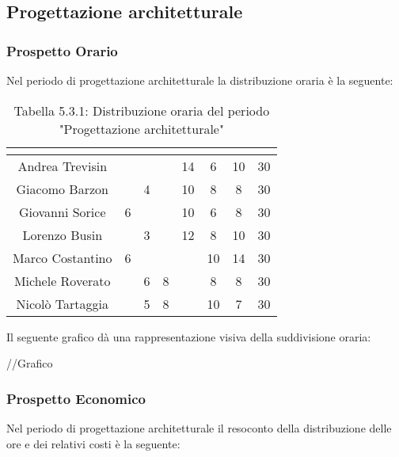 \subsection{Progettazione architetturale}

\subsubsection{Prospetto Orario}
Nel periodo di progettazione architetturale la distribuzione oraria è la seguente:

\renewcommand{\arraystretch}{1.5}
\begin{table}[H]
\begin{center}
\begin{tabular}{|c|c|c|c|c|c|c|c|}
\hline
\rowcolor{title_row}
\textbf{\color{title_text}{Nome}} & \textbf{\color{title_text}{Resp.}} & \textbf{\color{title_text}{Ammi.}} & \textbf{\color{title_text}{Analist.}} & \textbf{\color{title_text}{Progett.}} & \textbf{\color{title_text}{Program.}} & \textbf{\color{title_text}{Verific.}} & \textbf{\color{title_text}{Totale}} \\ \hline
Andrea Trevisin  & & & & 14 & 6 & 10 & 30 \\ \hline
Giacomo Barzon   &  & 4 &  & 10 & 8 & 8 & 30\\ \hline
Giovanni Sorice  & 6 &  &  & 10 & 6 & 8 & 30\\ \hline
Lorenzo Busin    &  & 3  &  & 12 & 8 & 10 & 30\\ \hline
Marco Costantino & 6 &  &  &  & 10 & 14 & 30\\ \hline
Michele Roverato &  & 6 & 8 &  & 8 & 8 & 30\\ \hline
Nicolò Tartaggia &  & 5  & 8 &  & 10 & 7 & 30\\ \hline
\end{tabular}
\caption{Tabella 5.3.1: Distribuzione oraria del periodo "Progettazione architetturale"\label{}}
\end{center}
\end{table}
\renewcommand{\arraystretch}{1}

Il seguente grafico dà una rappresentazione visiva della suddivisione oraria: \\
\begin{center}
//Grafico
\end{center}


\subsubsection{Prospetto Economico}
Nel periodo di progettazione architetturale il resoconto della distribuzione delle ore e dei relativi costi è la seguente:

